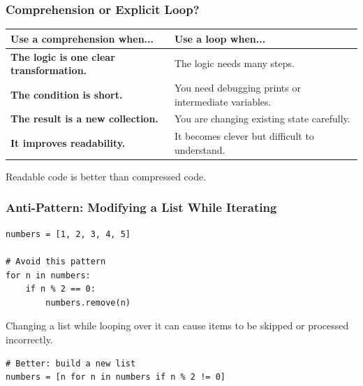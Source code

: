 \documentclass[aspectratio=169,10pt]{beamer}
\newenvironment{bluebox}[1]{%
  \vspace{0.08cm}\begin{tcolorbox}[lecturebox,title={#1},fontupper=\small]%
}{\end{tcolorbox}\vspace{0.05cm}}
\begin{document}
\begin{frame}
\frametitle{Comprehension or Explicit Loop?}
\small
\renewcommand{\arraystretch}{1.25}
\begin{tabularx}{\linewidth}{>{\bfseries}p{4.0cm}X}
\toprule
Use a comprehension when... & Use a loop when... \\
\midrule
The logic is one clear transformation. & The logic needs many steps. \\
The condition is short. & You need debugging prints or intermediate variables. \\
The result is a new collection. & You are changing existing state carefully. \\
It improves readability. & It becomes clever but difficult to understand. \\
\bottomrule
\end{tabularx}
\begin{bluebox}{Main principle}
Readable code is better than compressed code.
\end{bluebox}
\end{frame}

\begin{frame}[fragile]
\frametitle{Anti-Pattern: Modifying a List While Iterating}
\begin{lstlisting}[style=py]
numbers = [1, 2, 3, 4, 5]

# Avoid this pattern
for n in numbers:
    if n % 2 == 0:
        numbers.remove(n)
\end{lstlisting}
\begin{bluebox}{Why it is risky}
Changing a list while looping over it can cause items to be skipped or processed incorrectly.
\end{bluebox}
\begin{lstlisting}[style=py]
# Better: build a new list
numbers = [n for n in numbers if n % 2 != 0]
\end{lstlisting}
\end{frame}
\end{document}
